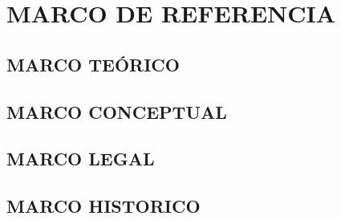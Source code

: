 \chapter{MARCO DE REFERENCIA}
\section{MARCO TE\'ORICO}
\section{MARCO CONCEPTUAL}
\section{MARCO LEGAL}
\section{MARCO HISTORICO}